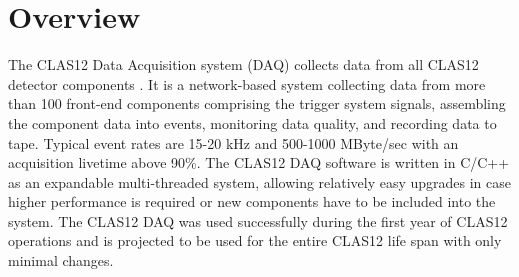 \section{Overview}

The CLAS12 Data Acquisition system (DAQ) collects data from all CLAS12 detector components \cite{clas12-nim}. It is a network-based system collecting data from more than 100 front-end components comprising the trigger system signals, assembling the component data into events, monitoring data quality, and recording data to tape. Typical event rates are 15-20 kHz and 500-1000 MByte/sec with an acquisition livetime above 90\%. The CLAS12 DAQ software is written in C/C++ as an expandable multi-threaded system, allowing relatively easy upgrades in case higher performance is required or new components have to be included into the system. The CLAS12 DAQ was used successfully during the first year of CLAS12 operations and is projected to be used for the entire CLAS12 life span with only minimal changes.


